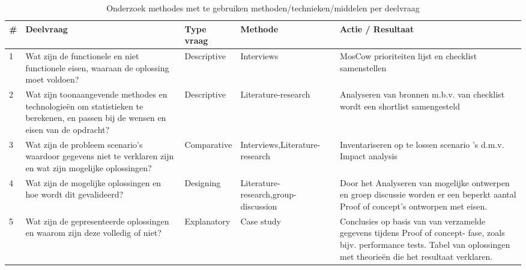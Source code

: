 \begin{center}
\begin{table}[bh]
\caption{Onderzoek methodes met te gebruiken methoden/technieken/middelen per deelvraag}
\label{tab:onderzoekmethode}
\def\arraystretch{1.5}
\begin{tabular}{|l|p{4cm}|p{2cm}|p{2.5cm}|p{4.5cm}|}
\hline
\textbf{\#} & \textbf{Deelvraag} & \textbf{Type vraag} & \textbf{Methode} & \textbf{Actie / Resultaat} \\
\hline
1 & Wat zijn de functionele en niet functionele eisen, waaraan de oplossing moet voldoen?
  & Descriptive
  & Interviews
  & MosCow prioriteiten lijst en checklist samenstellen \\
\hline
2 & Wat zijn toonaangevende methodes en technologieën om statistieken te berekenen, en passen bij de wensen en eisen van de opdracht?
  & Descriptive
  & Literature-\newline research
  & Analyseren van bronnen m.b.v. van checklist wordt een shortlist samengesteld  \\
\hline
3 & Wat zijn de probleem scenario's waardoor gegevens niet te verklaren zijn en wat zijn mogelijke oplossingen?
  & Comparative
  & Interviews,\newline Literature-\newline research
  & Inventariseren op te lossen scenario 's d.m.v. Impact analysis \\
\hline
4 & Wat zijn de mogelijke oplossingen en hoe wordt dit gevalideerd?
   & Designing
   & Literature-\newline research,\newline group-discussion
   & Door het Analyseren van mogelijke ontwerpen en groep discussie worden er een beperkt aantal Proof of concept's ontworpen met eisen. \\
\hline
5 & Wat zijn de gepresenteerde oplossingen en waarom zijn deze volledig of niet?
  & Explanatory
  & Case study
  & Conclusies op basis van van verzamelde gegevens tijdens Proof of concept- fase, zoals bijv. performance tests. Tabel van oplossingen met theorieën die het resultaat verklaren. \\
\hline
\end{tabular}
\end{table}
\end{center}